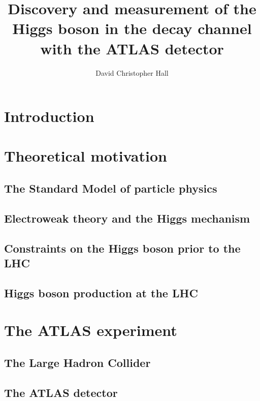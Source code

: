 \documentclass[hyper,linkcolor=blue]{mythesis}
\title{Discovery and measurement of the Higgs boson in the \WW decay channel with the ATLAS detector}
\author{David Christopher Hall}
\begin{document}
\begin{frontmatter}
  
\end{frontmatter}

\begin{mainmatter}
  \listoftodos
  
  \chapter*{Introduction}
    \label{chap:intro}
    

  \chapter{Theoretical motivation}
    \label{chap:motivation}
    
    \section{The Standard Model of particle physics}
      \label{sec:sm}
      
    \section{Electroweak theory and the Higgs mechanism}
      \label{sec:ewsb}
      
    \section{Constraints on the Higgs boson prior to the LHC}
      \label{sec:prior_constraints}
      
    \section{Higgs boson production at the LHC}
      \label{sec:higgs_production}
      

  \chapter{The ATLAS experiment}
    \label{chap:experiment}
    
    \section{The Large Hadron Collider}
      \label{sec:lhc}
      
    \section{The ATLAS detector}
      \label{sec:atlas}
      

\end{mainmatter}
\end{document}
